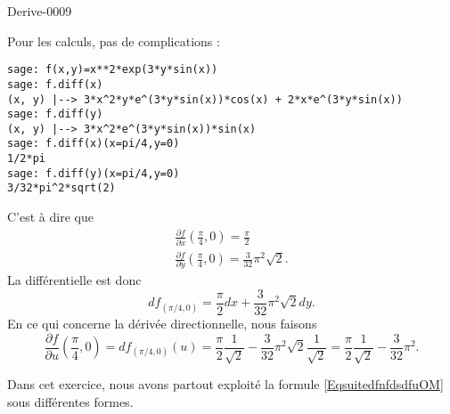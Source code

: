 
\begin{corrige}{Derive-0009}

    Pour les calculs, pas de complications :
    \begin{verbatim}
sage: f(x,y)=x**2*exp(3*y*sin(x))
sage: f.diff(x)            
(x, y) |--> 3*x^2*y*e^(3*y*sin(x))*cos(x) + 2*x*e^(3*y*sin(x))
sage: f.diff(y)
(x, y) |--> 3*x^2*e^(3*y*sin(x))*sin(x)
sage: f.diff(x)(x=pi/4,y=0)
1/2*pi
sage: f.diff(y)(x=pi/4,y=0)
3/32*pi^2*sqrt(2)
    \end{verbatim}
    C'est à dire que
    \begin{subequations}
        \begin{align}
            \frac{ \partial f }{ \partial x }(\frac{ \pi }{ 4 },0)=\frac{ \pi }{ 2 }\\
            \frac{ \partial f }{ \partial y } (\frac{ \pi }{ 4 },0)=\frac{ 3 }{ 32 }\pi^2\sqrt{2}.
        \end{align}
    \end{subequations}
    La différentielle est donc
    \begin{equation}
        df_{(\pi/4,0)}=\frac{ \pi }{ 2 }dx+\frac{ 3 }{ 32 }\pi^2\sqrt{2}dy.
    \end{equation}
    En ce qui concerne la dérivée directionnelle, nous faisons
    \begin{equation}
        \frac{ \partial f }{ \partial u }(\frac{ \pi }{ 4 },0)=df_{(\pi/4,0)}(u)=\frac{ \pi }{2}\frac{1}{ \sqrt{2} }-\frac{ 3 }{ 32 }\pi^2\sqrt{2}\frac{1}{ \sqrt{2} }=\frac{ \pi }{2}\frac{1}{ \sqrt{2} }-\frac{ 3 }{ 32 }\pi^2.
    \end{equation}

    Dans cet exercice, nous avons partout exploité la formule \eqref{EqsuitedfnfdsdfuOM} sous différentes formes.
\end{corrige}
